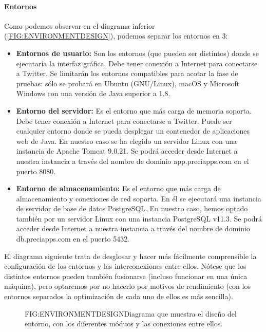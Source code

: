 \paragraph{Entornos}
Como podemos observar en el diagrama inferior (\ref{FIG:ENVIRONMENTDESIGN}), podemos separar los entornos en 3:
\begin{itemize}
	\item \textbf{Entornos de usuario:} Son los entornos (que pueden ser distintos) donde se ejecutaría la interfaz gráfica. Debe tener conexión a Internet para conectarse a Twitter. Se limitarán los entornos compatibles para acotar la fase de pruebas: sólo se probará en Ubuntu (GNU/Linux), macOS y Microsoft Windows con una versión de Java superior a 1.8.
	\item \textbf{Entorno del servidor:} Es el entorno que más carga de memoria soporta. Debe tener conexión a Internet para conectarse a Twitter. Puede ser cualquier entorno donde se pueda desplegar un contenedor de aplicaciones web de Java. En nuestro caso se ha elegido un servidor Linux con una instancia de Apache Tomcat 9.0.21. Se podrá acceder desde Internet a nuestra instancia a través del nombre de dominio app.preciapps.com en el puerto 8080. \newpage
	\item \textbf{Entorno de almacenamiento:} Es el entorno que más carga de almacenamiento y conexiones de red soporta. En él se ejecutará una instancia de servidor de base de datos PostgreSQL. En nuestro caso, hemos optado también por un servidor Linux con una instancia PostgreSQL v11.3. Se podrá acceder desde Internet a nuestra instancia a través del nombre de dominio db.preciapps.com en el puerto 5432.
\end{itemize}
El diagrama siguiente trata de desglosar y hacer más fácilmente comprensible la configuración de los entornos y las interconexiones entre ellos. Nótese que los distintos entornos pueden también fusionarse (incluso funcionar en una única máquina), pero optaremos por no hacerlo por motivos de rendimiento (con los entornos separados la optimización de cada uno de ellos es más sencilla). 
\begin{figure}[Diseño del entorno]{FIG:ENVIRONMENTDESIGN}{Diagrama que muestra el diseño del entorno, con los diferentes móduos y las conexiones entre ellos.}
\end{figure}
\newpage
